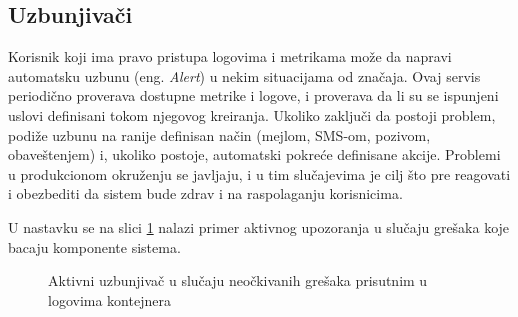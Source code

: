 \documentclass[12pt,oneside]{memoir}
\begin{document}

\subsection{Uzbunjivači}

Korisnik koji ima pravo pristupa logovima i metrikama može da napravi automatsku uzbunu (eng. \emph{Alert}) u nekim situacijama od značaja. Ovaj servis periodično proverava dostupne metrike i logove, i proverava da li su se ispunjeni uslovi definisani tokom njegovog kreiranja. Ukoliko zaključi da postoji problem, podiže uzbunu na ranije definisan način (mejlom, SMS-om, pozivom, obaveštenjem) i, ukoliko postoje, automatski pokreće definisane akcije. Problemi u produkcionom okruženju se javljaju, i u tim slučajevima je cilj što pre reagovati i obezbediti da sistem bude zdrav i na raspolaganju korisnicima.

U nastavku se na slici \ref{fig:alertex} nalazi primer aktivnog upozoranja u slučaju grešaka koje bacaju komponente sistema.

\begin{figure}[!ht]
  \centering
  \caption{Aktivni uzbunjivač u slučaju neočkivanih grešaka prisutnim u logovima kontejnera}
  \label{fig:alertex}
\end{figure}
\end{document}
